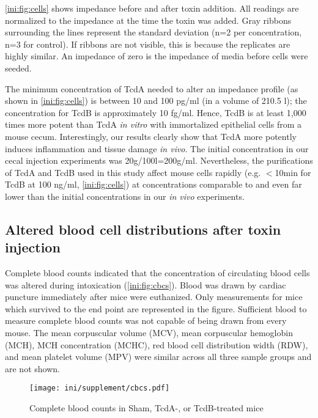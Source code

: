 \autoref{ini:fig:cells} shows impedance before and after toxin
addition. All readings are normalized to the impedance
at the time the toxin was added. Gray ribbons surrounding the lines represent
the standard deviation (n=2 per concentration, n=3 for control). If ribbons are not visible, 
this is because the replicates are highly similar. An impedance of zero
is the impedance of media before cells were seeded.

The minimum concentration of 
TcdA needed to alter an impedance profile (as shown in \autoref{ini:fig:cells}) is
between 10 and 100 pg/ml (in a volume of 210.5 \textmu{}l); the concentration for TcdB is 
approximately 10 fg/ml. 
Hence, TcdB is at least 1,000 times more potent than TcdA
\emph{in vitro} with immortalized epithelial cells from a mouse cecum. Interestingly, our results
clearly show that TcdA more potently induces inflammation and
tissue damage \emph{in vivo}. 
The initial concentration in our cecal injection experiments was 20\textmu{}g/100\textmu{}l=200\textmu{}g/ml. 
Nevertheless, the purifications of TcdA and TcdB used
in this study affect mouse cells rapidly (e.g. $<$10min for TcdB at 100 ng/ml, \autoref{ini:fig:cells}) at concentrations comparable to and even far lower than 
the initial concentrations in our \emph{in vivo} experiments.

\subsection{Altered blood cell distributions after toxin injection}

Complete blood counts indicated that the concentration of circulating
blood cells was altered during intoxication (\autoref{ini:fig:cbcs}). 
Blood was drawn by cardiac puncture immediately after mice were euthanized.
Only measurements for mice which survived to the end point are represented
in the figure. Sufficient blood to measure complete blood counts was not 
capable of being drawn from every mouse. The mean corpuscular volume (MCV), 
mean corpuscular hemoglobin (MCH), MCH concentration (MCHC), red blood
cell distribution width (RDW), and mean platelet volume (MPV) were
similar across all three sample groups and are not shown.

\begin{figure}[ht]
\centering
\begin{adjustwidth}{-1cm}{}
\texttt{[image: ini/supplement/cbcs.pdf]}
\end{adjustwidth}
\caption{Complete blood counts in Sham, TcdA-, or TcdB-treated mice}
\label{ini:fig:cbcs}
\end{figure}

